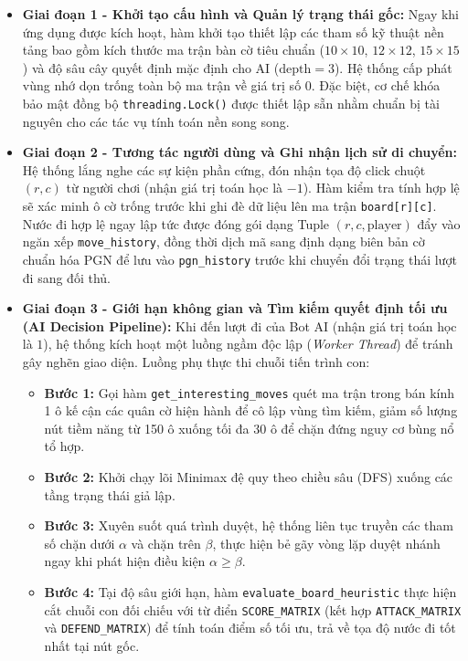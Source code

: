 \begin{itemize}
	\item \textbf{Giai đoạn 1 - Khởi tạo cấu hình và Quản lý trạng thái gốc:} 
	Ngay khi ứng dụng được kích hoạt, hàm khởi tạo thiết lập các tham số kỹ thuật nền tảng bao gồm kích thước ma trận bàn cờ tiêu chuẩn ($10 \times 10$, $12 \times 12$, $15 \times 15$) và độ sâu cây quyết định mặc định cho AI ($\text{depth} = 3$). Hệ thống cấp phát vùng nhớ dọn trống toàn bộ ma trận về giá trị số $0$. Đặc biệt, cơ chế khóa bảo mật đồng bộ \texttt{threading.Lock()} được thiết lập sẵn nhằm chuẩn bị tài nguyên cho các tác vụ tính toán nền song song.
	
	\item \textbf{Giai đoạn 2 - Tương tác người dùng và Ghi nhận lịch sử di chuyển:} 
	Hệ thống lắng nghe các sự kiện phần cứng, đón nhận tọa độ click chuột $(r, c)$ từ người chơi (nhận giá trị toán học là $-1$). Hàm kiểm tra tính hợp lệ sẽ xác minh ô cờ trống trước khi ghi đè dữ liệu lên ma trận \texttt{board[r][c]}. Nước đi hợp lệ ngay lập tức được đóng gói dạng Tuple $(r, c, \text{player})$ đẩy vào ngăn xếp \texttt{move\_history}, đồng thời dịch mã sang định dạng biên bản cờ chuẩn hóa PGN để lưu vào \texttt{pgn\_history} trước khi chuyển đổi trạng thái lượt đi sang đối thủ.
	
	\item \textbf{Giai đoạn 3 - Giới hạn không gian và Tìm kiếm quyết định tối ưu (AI Decision Pipeline):} 
	Khi đến lượt đi của Bot AI (nhận giá trị toán học là $1$), hệ thống kích hoạt một luồng ngầm độc lập (\textit{Worker Thread}) để tránh gây nghẽn giao diện. Luồng phụ thực thi chuỗi tiến trình con:
	\begin{itemize}
		\item \textbf{Bước 1:} Gọi hàm \texttt{get\_interesting\_moves} quét ma trận trong bán kính 1 ô kế cận các quân cờ hiện hành để cô lập vùng tìm kiếm, giảm số lượng nút tiềm năng từ 150 ô xuống tối đa 30 ô để chặn đứng nguy cơ bùng nổ tổ hợp.
		\item \textbf{Bước 2:} Khởi chạy lõi Minimax đệ quy theo chiều sâu (DFS) xuống các tầng trạng thái giả lập.
		\item \textbf{Bước 3:} Xuyên suốt quá trình duyệt, hệ thống liên tục truyền các tham số chặn dưới $\alpha$ và chặn trên $\beta$, thực hiện bẻ gãy vòng lặp duyệt nhánh ngay khi phát hiện điều kiện $\alpha \ge \beta$.
		\item \textbf{Bước 4:} Tại độ sâu giới hạn, hàm \texttt{evaluate\_board\_heuristic} thực hiện cắt chuỗi con đối chiếu với từ điển \texttt{SCORE\_MATRIX} (kết hợp \texttt{ATTACK\_MATRIX} và \texttt{DEFEND\_MATRIX}) để tính toán điểm số tối ưu, trả về tọa độ nước đi tốt nhất tại nút gốc.
	\end{itemize}
	

\end{itemize}
